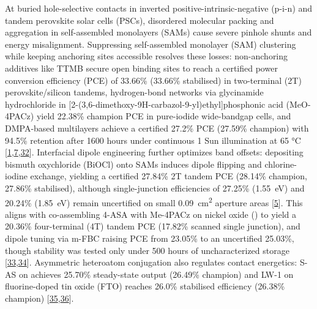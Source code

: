 \documentclass[
  11pt,
]{article}
\begin{document}
At buried hole-selective contacts in inverted
positive-intrinsic-negative (p-i-n) and tandem perovskite solar cells
(PSCs), disordered molecular packing and aggregation in self-assembled
monolayers (SAMs) cause severe pinhole shunts and energy misalignment.
Suppressing self-assembled monolayer (SAM) clustering while keeping
anchoring sites accessible resolves these losses: non-anchoring
additives like TTMB secure open binding sites to reach a certified power
conversion efficiency (PCE) of 33.66\% (33.66\% stabilised) in
two-terminal (2T) perovskite/silicon tandems, hydrogen-bond networks via
glycinamide hydrochloride in
{[}2-(3,6-dimethoxy-9H-carbazol-9-yl)ethyl{]}phosphonic acid (MeO-4PACz)
yield 22.38\% champion PCE in pure-iodide wide-bandgap cells, and
DMPA-based multilayers achieve a certified 27.2\% PCE (27.59\% champion)
with 94.5\% retention after 1600 hours under continuous 1 Sun
illumination at 65 °C
{[}\href{https://doi.org/10.1038/s41467-026-76266-0}{1},\href{https://doi.org/10.1038/s41467-026-76497-1}{7},\href{https://doi.org/10.1016/j.decarb.2026.100190}{32}{]}.
Interfacial dipole engineering further optimizes band offsets:
depositing bismuth oxychloride (BiOCl) onto SAMs induces dipole flipping
and chlorine-iodine exchange, yielding a certified 27.84\% 2T tandem PCE
(28.14\% champion, 27.86\% stabilised), although single-junction
efficiencies of 27.25\% (\qty{1.55}{\electronvolt}) and 20.24\%
(\qty{1.85}{\electronvolt}) remain uncertified on small
\qty{0.09}{\centi\meter\squared} aperture areas
{[}\href{https://doi.org/10.1038/s41467-026-76786-9}{5}{]}. This aligns
with co-assembling 4-ASA with Me-4PACz on nickel oxide () to
yield a 20.36\% four-terminal (4T) tandem PCE (17.82\% scanned single
junction), and dipole tuning via m-FBC raising PCE from 23.05\% to an
uncertified 25.03\%, though stability was tested only under 500 hours of
uncharacterized storage
{[}\href{https://doi.org/10.1038/s41467-026-76847-z}{33},\href{https://doi.org/10.1021/acsami.6c11467}{34}{]}.
Asymmetric heteroatom conjugation also regulates contact energetics:
S-AS on  achieves 25.70\% steady-state output (26.49\%
champion) and LW-1 on fluorine-doped tin oxide (FTO) reaches 26.0\%
stabilised efficiency (26.38\% champion)
{[}\href{https://doi.org/10.1002/adfm.77712}{35},\href{https://doi.org/10.1002/aenm.71482}{36}{]}.
\end{document}
